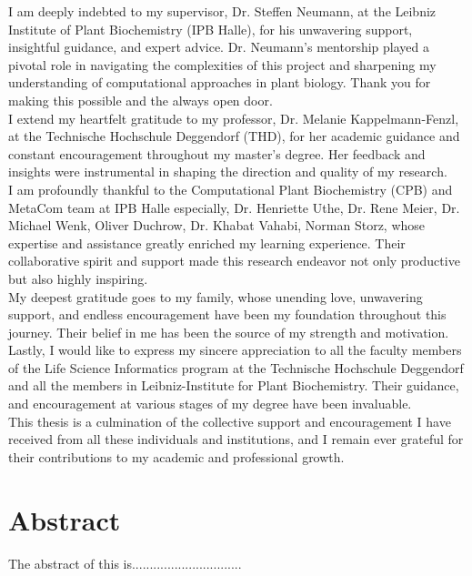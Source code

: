 \documentclass[12pt,a4paper]{article}
\begin{document}
I am deeply indebted to my supervisor, Dr. Steffen Neumann, at the Leibniz Institute of Plant Biochemistry (IPB Halle), for his unwavering support, insightful guidance, and expert advice. Dr. Neumann’s mentorship played a pivotal role in navigating the complexities of this project and sharpening my understanding of computational approaches in plant biology. Thank you for making this possible and the always open door. \\

I extend my heartfelt gratitude to my professor, Dr. Melanie Kappelmann-Fenzl, at the Technische Hochschule Deggendorf (THD), for her academic guidance and constant encouragement throughout my master’s degree. Her feedback and insights were instrumental in shaping the direction and quality of my research. \\

I am profoundly thankful to the Computational Plant Biochemistry (CPB) and  MetaCom team at IPB Halle especially, Dr. Henriette Uthe, Dr. Rene Meier, Dr. Michael Wenk, Oliver Duchrow, Dr. Khabat Vahabi, Norman Storz, whose expertise and assistance greatly enriched my learning experience. Their collaborative spirit and support made this research endeavor not only productive but also highly inspiring. \\

My deepest gratitude goes to my family, whose unending love, unwavering support, and endless encouragement have been my foundation throughout this journey. Their belief in me has been the source of my strength and motivation. \\

Lastly, I would like to express my sincere appreciation to all the faculty members of the Life Science Informatics program at the Technische Hochschule Deggendorf and all the members in Leibniz-Institute for Plant Biochemistry. Their guidance, and encouragement at various stages of my degree have been invaluable. \\

This thesis is a culmination of the collective support and encouragement I have received from all these individuals and institutions, and I remain ever grateful for their contributions to my academic and professional growth. \\


\newpage
\section{Abstract}
\noindent
The abstract of this is...............................
\end{document}
